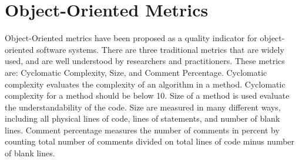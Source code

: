 



\section{Object-Oriented Metrics}
Object-Oriented metrics have been proposed as a quality indicator for object-oriented software systems. There are three traditional metrics that are widely used, and are well understood by researchers and practitioners\cite{quenelobject}. These metrics are: Cyclomatic Complexity, Size, and Comment Percentage. Cyclomatic complexity evaluates the complexity of an algorithm in a method. Cyclomatic complexity for a method should be below 10\cite{quenelobject}. Size of a method is used evaluate the understandability of the code. Size are measured in many different ways, including all physical lines of code, lines of statements, and number of blank lines. Comment percentage measures the number of comments in percent by counting total number of comments divided on total lines of code minus number of blank lines.

